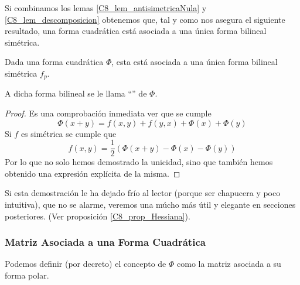 Si combinamos los lemas \ref{C8_lem_antisimetricaNula} y \ref{C8_lem_descomposicion} obtenemos que, tal y como nos asegura el siguiente resultado, una forma cuadrática está asociada a una única forma bilineal simétrica.
\begin{prop}
	Dada una forma cuadrática $\Phi$, esta está asociada a una única forma bilineal simétrica $f_p$.
	
	A dicha forma bilineal se le llama ``'' de $\Phi$.
\end{prop}
\begin{proof}
	Es una comprobación inmediata ver que se cumple
	\[\Phi(x+y)=f(x,y)+f(y,x)+\Phi(x)+\Phi(y)\]
	Si $f$ es simétrica se cumple que
	\[f(x,y)=\frac{1}{2}\left(\Phi(x+y)-\Phi(x)-\Phi(y)\right)\]
	Por lo que no solo hemos demostrado la unicidad, sino que también hemos obtenido una expresión explícita de la misma.
\end{proof}
Si esta demostración le ha dejado frío al lector (porque ser chapucera y poco intuitiva), que no se alarme, veremos una múcho más útil y elegante en secciones posteriores. (Ver proposición \ref{C8_prop_Hessiana}).
\subsubsection{Matriz Asociada a una Forma Cuadrática}
Podemos definir (por decreto) el concepto de  $\Phi$ como la matriz asociada a su forma polar.

